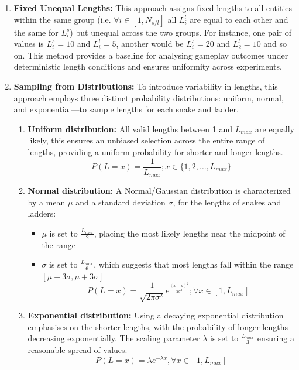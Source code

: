 \begin{enumerate}
	\item \textbf{Fixed Unequal Lengths:} This approach assigns fixed lengths to all entities within the same group (i.e. $\forall i \in [1, N_{s/l}]$ all $L^l_i$ are equal to each other and the same for $L^s_i$) but unequal across the two groups. For instance, one pair of values is $L^s_i = 10$ and $L^l_i = 5$, another would be $L^s_i = 20$ and $L^l_2 = 10$ and so on. This method provides a baseline for analysing gameplay outcomes under deterministic length conditions and ensures uniformity across experiments.
	
	\item \textbf{Sampling from Distributions:} To introduce variability in lengths, this approach employs three distinct probability distributions: uniform, normal, and exponential—to sample lengths for each snake and ladder.
	
	\begin{enumerate}
		\item \textbf{Uniform distribution: }All valid lengths between 1 and $L_{max}$ are equally likely, this ensures an unbiased selection across the entire range of lengths, providing a uniform probability for shorter and longer lengths.
		$$P(L=x)=\frac{1}{L_{max}}; x \in \{1,2,\ldots,L_{max}\}$$
		\item \textbf{Normal distribution:} A Normal/Gaussian distribution is characterized by a mean $\mu$ and a standard deviation $\sigma$, for the lengths of snakes and ladders:
		\begin{itemize}
			\item $\mu$ is set to $\frac{L_{max}}{2}$, placing the most likely lengths near the midpoint of the range
			\item $\sigma$ is set to $\frac{L_{max}}{6}$, which suggests that most lengths fall within the range $[\mu-3\sigma, \mu+3\sigma]$
			$$P(L=x) = \frac{1}{\sqrt{2\pi\sigma^2}}{e^{\frac{(x-\mu)^2}{2\sigma^2}}; \forall x\in[1, L_{max}]}$$
		\end{itemize}
		\item \textbf{Exponential distribution: } Using a decaying exponential distribution emphasises on the shorter lengths, with the probability of longer lengths decreasing exponentially. The scaling parameter $\lambda$ is set to $\frac{L_{max}}{3}$ ensuring a reasonable spread of values.
		$$P(L=x)={\lambda}e^{{-\lambda}x}, \forall x \in [1, L_{max}]$$
	\end{enumerate}
	

\end{enumerate}
